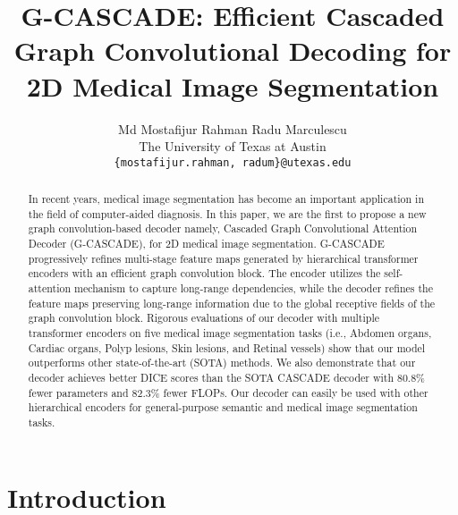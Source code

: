 \documentclass[10pt,twocolumn,letterpaper]{article}
\begin{document}
\title{G-CASCADE: Efficient Cascaded Graph Convolutional Decoding for 2D Medical Image Segmentation}
\author{Md Mostafijur Rahman \qquad Radu Marculescu\\
The University of Texas at Austin\\
{\tt\small \{mostafijur.rahman, radum\}@utexas.edu}
}

\maketitle
\thispagestyle{empty}

\begin{abstract}
   In recent years, medical image segmentation has become an important application in the field of computer-aided diagnosis. In this paper, we are the first to propose a new graph convolution-based decoder namely, Cascaded Graph Convolutional Attention Decoder (G-CASCADE), for 2D medical image segmentation. G-CASCADE progressively refines multi-stage feature maps generated by hierarchical transformer encoders with an efficient graph convolution block. The encoder utilizes the self-attention mechanism to capture long-range dependencies, while the decoder refines the feature maps preserving long-range information due to the global receptive fields of the graph convolution block. Rigorous evaluations of our decoder with multiple transformer encoders on \color{black}five \color{black}medical image segmentation tasks (i.e., Abdomen organs, Cardiac organs, Polyp lesions, Skin lesions, \color{black}and Retinal vessels\color{black}) show that our model outperforms other state-of-the-art (SOTA) methods. We also demonstrate that our decoder achieves better DICE scores than the SOTA CASCADE decoder \color{black}with 80.8\% fewer parameters and 82.3\% fewer FLOPs\color{black}. Our decoder can easily be used with other hierarchical encoders for general-purpose semantic and medical image segmentation tasks.
   


\end{abstract}

\section{Introduction}
\end{document}
